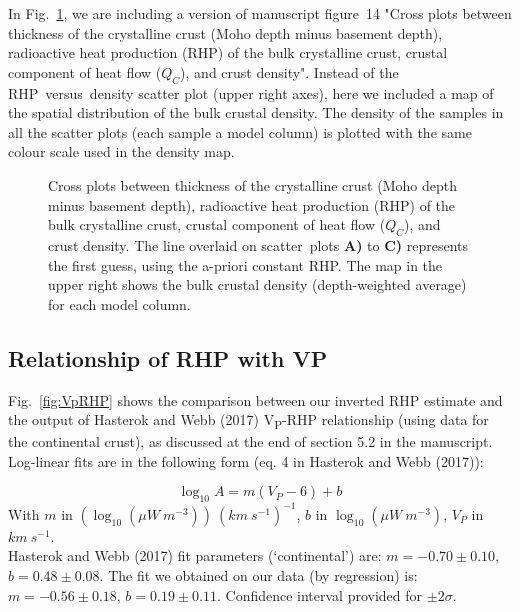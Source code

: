 {\begin{subappendices}
In Fig.~\ref{fig:RhoRHP}, we are including a version of manuscript figure~14 "Cross plots between thickness of the crystalline crust (Moho depth minus basement depth), radioactive heat production (RHP) of the bulk crystalline crust, crustal component of heat flow ($Q_C$), and crust density".
Instead of the RHP~versus~density scatter plot (upper right axes), here we included a map of the spatial distribution of the bulk crustal density.
The density of the samples in all the scatter plots (each sample a model column) is plotted with the same colour scale used in the density map.

\begin{figure}
	\begin{adjustbox}{center}
	\end{adjustbox}
	\caption{Cross plots between thickness of the crystalline crust (Moho depth minus basement depth), radioactive heat production (RHP) of the bulk crystalline crust, crustal component of heat flow ($Q_C$), and crust density. The line overlaid on scatter~plots \textbf{A)} to \textbf{C)} represents the first guess, using the a-priori constant RHP.
	The map in the upper right shows the bulk crustal density (depth-weighted average) for each model column.}
	\label{fig:RhoRHP}
\end{figure}

\subsection{Relationship of RHP with VP}
\label{ss:ApplSup:Rel:VP}

Fig.~\ref{fig:VpRHP} shows the comparison between our inverted RHP estimate and the output of Hasterok and Webb (2017) V\textsubscript{P}-RHP relationship (using data for the continental crust), as discussed at the end of section 5.2 in the manuscript.
Log-linear fits are in the following form (eq. 4 in Hasterok and Webb (2017)):

\begin{equation*}
	\log_{10} A = m (V_{P} - 6) + b
\end{equation*}
With $m$ in $(\log_{10} (\mu W \ m^{-3})) \ (km \ s^{-1})^{-1}$, $b$ in $\log_{10} (\mu W \ m^{-3})$, $V_{P}$ in $km \ s^{-1}$. \\
Hasterok and Webb (2017) fit parameters (`continental') are: $m = -0.70 \pm 0.10$, $b = 0.48 \pm 0.08$.
The fit we obtained on our data (by regression) is: $m = -0.56 \pm 0.18$, $b = 0.19 \pm 0.11$.
Confidence interval provided for $\pm 2 \sigma$.


\end{subappendices}}
